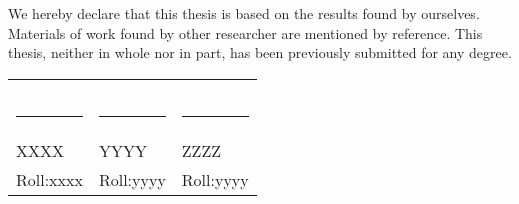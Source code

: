 We hereby declare that this thesis is based on the results found by ourselves. Materials
of work found by other researcher are mentioned by reference. This thesis, neither in
whole nor in part, has been previously submitted for any degree.

\bigskip
\bigskip
\bigskip


\begin{tabular}{p{5cm}p{5cm}p{5cm}}
\centering
     &  &   \\
     &  &   \\
     &  &   \\
  \rule{3.5cm}{1pt} & \rule{3.5cm}{1pt} & \rule{3.5cm}{1pt}\\
  XXXX & YYYY  &ZZZZ\\
  Roll:xxxx & Roll:yyyy  &Roll:yyyy\\

\end{tabular}
